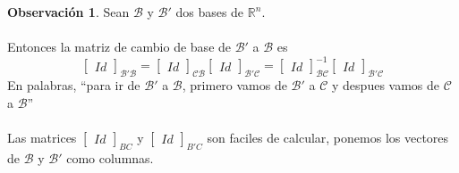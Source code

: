 \documentclass{article}
\theoremstyle{definition}
\theoremstyle{definition}
\newtheorem*{obs}{Observación}
\theoremstyle{remark}
\begin{document}
\begin{obs}
  Sean $\mathcal{B}$ y $\mathcal{B'}$ dos bases de $\mathbb{R}^n$. \\\\ Entonces la matriz de cambio de base de $\mathcal{B'}$ a $\mathcal{B}$ es \[
    \begin{bmatrix}Id\end{bmatrix}_{\mathcal{B'}\mathcal{B}}=\begin{bmatrix}Id\end{bmatrix}_{\mathcal{C}\mathcal{B}}\begin{bmatrix}Id\end{bmatrix}_{\mathcal{B'C}}=\begin{bmatrix}Id\end{bmatrix}^{-1}_\mathcal{BC}\begin{bmatrix}Id\end{bmatrix}_{\mathcal{B'C}}
  \]En palabras, ``para ir de $\mathcal{B'}$ a $\mathcal{B}$, primero vamos de $\mathcal{B'}$ a $\mathcal{C}$ y despues vamos de $\mathcal{C}$ a $\mathcal{B}$'' \\\\ Las matrices $\begin{bmatrix}Id\end{bmatrix}_{BC}$ y $\begin{bmatrix}Id\end{bmatrix}_{B'C}$ son faciles de calcular, ponemos los vectores de $\mathcal{B}$ y $\mathcal{B'}$ como columnas.
\end{obs}
\pagebreak
\end{document}
